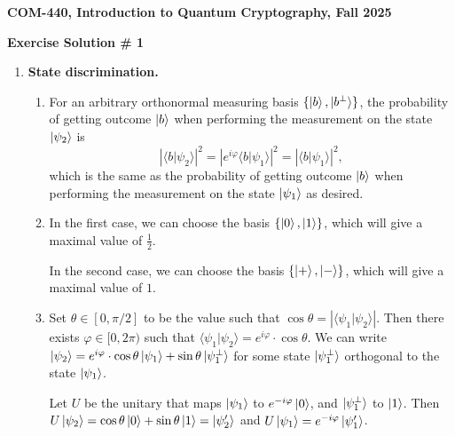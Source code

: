 \documentclass[12pt]{article}
\newcommand{\header}[1]{\begin{center} {\large\bf #1} \end{center}}
\begin{document}
\header{COM-440, Introduction to Quantum Cryptography, Fall 2025}
\header{\bf Exercise Solution \# 1}


\begin{enumerate}
	
\item {\bf State discrimination.}
\begin{enumerate}
	\item For an arbitrary orthonormal measuring basis $\{\ket{b}, \ket{b^\perp}\}$, the probability of getting outcome $\ket{b}$ when performing the measurement on the state $\ket{\psi_2}$ is
	\begin{equation*}
	|\langle b \vert \psi_2 \rangle|^2 = |e^{i\varphi}\langle b \vert \psi_1 \rangle|^2 = |\langle b \vert \psi_1 \rangle|^2,
	\end{equation*}
	which is the same as the probability of getting outcome $\ket{b}$ when performing the measurement on the state $\ket{\psi_1}$ as desired.
	\item In the first case, we can choose the basis $\{\ket{0}, \ket{1}\}$, which will give a maximal value of $\frac{1}{2}$.
	
	In the second case, we can choose the basis $\{\ket{+}, \ket{-}\}$, which will give a maximal value of $1$.
	\item Set $\theta \in [0, \pi/2]$ to be the value such that $\cos \theta = |\langle \psi_1 \vert \psi_2 \rangle|$. Then there exists $\varphi \in [0, 2\pi)$ such that $\langle \psi_1 \vert \psi_2 \rangle = e^{i\varphi} \cdot \cos \theta$. We can write $\ket{\psi_2} = e^{i\varphi} \cdot \cos \theta \ket{\psi_1} + \sin \theta \ket{\psi_1^\perp}$ for some state $\ket{\psi_1^\perp}$ orthogonal to the state $\ket{\psi_1}$. 
	 
		Let $U$ be the unitary that maps $\ket{\psi_1}$ to $e^{-i\varphi}\ket{0}$, and $\ket{\psi_1^\perp}$ to $\ket{1}$. Then $U\ket{\psi_2} = \cos\theta \ket{0} + \sin\theta \ket{1} = \ket{\psi_2'}$ and $U\ket{\psi_1} = e^{-i\varphi}\ket{\psi_1'}$.
			

\end{enumerate}
\end{enumerate}
\end{document}
